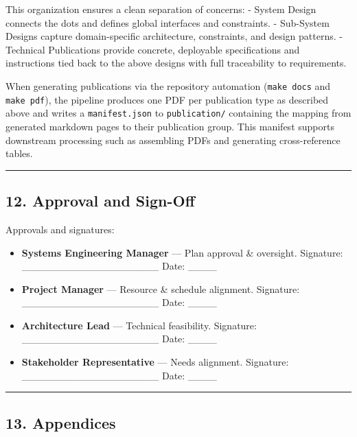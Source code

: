 \documentclass[12pt]{article}
\providecommand{\tightlist}{%
  \setlength{\itemsep}{0pt}\setlength{\parskip}{0pt}}
\begin{document}
This organization ensures a clean separation of concerns: - System
Design connects the dots and defines global interfaces and constraints.
- Sub-System Designs capture domain-specific architecture, constraints,
and design patterns. - Technical Publications provide concrete,
deployable specifications and instructions tied back to the above
designs with full traceability to requirements.

When generating publications via the repository automation
(\texttt{make\ docs} and \texttt{make\ pdf}), the pipeline produces one
PDF per publication type as described above and writes a
\texttt{manifest.json} to \texttt{publication/} containing the mapping
from generated markdown pages to their publication group. This manifest
supports downstream processing such as assembling PDFs and generating
cross-reference tables.

\begin{center}\rule{0.5\linewidth}{0.5pt}\end{center}

\subsection{12. Approval and Sign-Off}\label{approval-and-sign-off}

Approvals and signatures:

\begin{itemize}
\tightlist
\item
  \textbf{Systems Engineering Manager} --- Plan approval \& oversight.
  Signature: \_\_\_\_\_\_\_\_\_\_\_\_\_\_\_\_\_\_\_ Date: \_\_\_\_
\item
  \textbf{Project Manager} --- Resource \& schedule alignment.
  Signature: \_\_\_\_\_\_\_\_\_\_\_\_\_\_\_\_\_\_\_ Date: \_\_\_\_
\item
  \textbf{Architecture Lead} --- Technical feasibility. Signature:
  \_\_\_\_\_\_\_\_\_\_\_\_\_\_\_\_\_\_\_ Date: \_\_\_\_
\item
  \textbf{Stakeholder Representative} --- Needs alignment. Signature:
  \_\_\_\_\_\_\_\_\_\_\_\_\_\_\_\_\_\_\_ Date: \_\_\_\_
\end{itemize}

\begin{center}\rule{0.5\linewidth}{0.5pt}\end{center}

\subsection{13. Appendices}\label{appendices}
\end{document}
